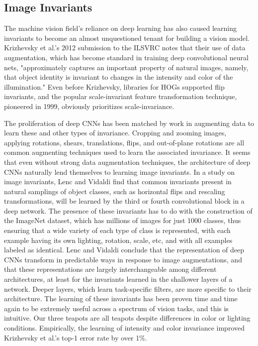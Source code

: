 \subsection{Image Invariants}
The machine vision field's reliance on deep learning has also caused learning invariants to become an almost unquestioned tenant for building a vision model. Krizhevsky et al.'s 2012 submission to the ILSVRC notes that their use of data augmentation, which has become standard in training deep convolutional neural nets, "approximately captures an important property of natural images, namely, that object identity is invariant to changes in the intensity and color of the illumination."\cite{krizhevsky2012imagenet} Even before Krizhevsky, libraries for HOGs supported flip invariants, and the popular scale-invariant feature transformation technique, pioneered in 1999, obviously prioritizes scale-invariance.\cite{vedaldi2010vlfeat}\cite{muja2014scalable} 

The proliferation of deep CNNs has been matched by work in augmenting data to learn these and other types of invariance. Cropping and zooming images, applying rotations, shears, translations, flips, and out-of-plane rotations are all common augmenting techniques used to learn the associated invariance. It seems that even without strong data augmentation techniques, the architecture of deep CNNs naturally lend themselves to learning image invariants. In a study on image invariants, Lenc and Vidaldi find that common invariants present in natural samplings of object classes, such as horizontal flips and rescaling transformations, will be learned by the third or fourth convolutional block in a deep network. The presence of these invariants has to do with the construction of the ImageNet dataset, which has millions of images for just 1000 classes, thus ensuring that a wide variety of each type of class is represented, with each example having its own lighting, rotation, scale, etc, and with all examples labeled as identical. Lenc and Vidaldi conclude that the representation of deep CNNs transform in predictable ways in response to image augmentations, and that these representations are largely interchangeable among different architectures, at least for the invariants learned in the shallower layers of a network. Deeper layers, which learn task-specific filters, are more specific to their architecture.\cite{lenc2015understanding} The learning of these invariants has been proven time and time again to be extremely useful across a spectrum of vision tasks, and this is intuitive. Our three teapots are all teapots despite differences in color or lighting conditions. Empirically, the learning of intensity and color invariance improved Krizhevsky et al.'s top-1 error rate by over 1\%.\cite{krizhevsky2012imagenet} 

